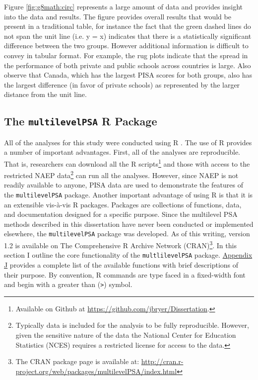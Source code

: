 \documentclass[letterpaper,12p,twoside]{article} %
\begin{document}
Figure \ref{fig:g8math:circ} represents a large amount of data and provides insight into the data and results. The figure provides overall results that would be present in a traditional table, for instance the fact that the green dashed lines do not span the unit line (i.e. y = x) indicates that there is a statistically significant difference between the two groups. However additional information is difficult to convey in tabular format. For example, the rug plots indicate that the spread in the performance of both private and public schools across countries is large. Also observe that Canada, which has the largest PISA scores for both groups, also has the largest difference (in favor of private schools) as represented by the larger distance from the unit line.


\subsection{The \texttt{multilevelPSA} R Package}


All of the analyses for this study were conducted using R \cite{rdevelopment}. The use of R provides a number of important advantages. First, all of the analyses are reproducible. That is, researchers can download all the R scripts\footnote{Available on Github at \url{https://github.com/jbryer/Dissertation}.} and those with access to the restricted NAEP data\footnote{Typically data is included for the analysis to be fully reproducible. However, given the sensitive nature of the data the National Center for Education Statistics (NCES) requires a restricted license for access to the data.} can run all the analyses. However, since NAEP is not readily available to anyone, PISA data are used to demonstrate the features of the \texttt{multilevelPSA} package. Another important advantage of using R is that it is an extensible vis-\`{a}-vis R packages. Packages are collections of functions, data, and documentation designed for a specific purpose. Since the multilevel PSA methods described in this dissertation have never been conducted or implemented elsewhere, the \texttt{multilevelPSA} package was developed. As of this writing, version 1.2 is available on The Comprehensive R Archive Network (CRAN)\footnote{The CRAN package page is available at: \url{http://cran.r-project.org/web/packages/multilevelPSA/index.html}}. In this section I outline the core functionality of the \texttt{multlilevelPSA} package. \hyperref[appendixJ]{Appendix J} provides a complete list of the available functions with brief descriptions of their purpose. By convention, R commands are type faced in a fixed-width font and begin with a greater than (\texttt{>}) symbol.
\end{document}
